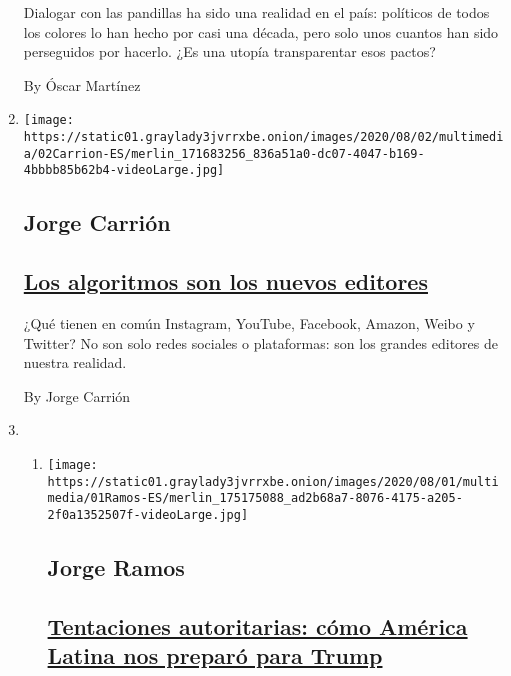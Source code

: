 \begin{enumerate}
  Dialogar con las pandillas ha sido una realidad en el país: políticos
  de todos los colores lo han hecho por casi una década, pero solo unos
  cuantos han sido perseguidos por hacerlo. ¿Es una utopía transparentar
  esos pactos?

  By Óscar Martínez
\item
  \texttt{[image: https://static01.graylady3jvrrxbe.onion/images/2020/08/02/multimedia/02Carrion-ES/merlin\_171683256\_836a51a0-dc07-4047-b169-4bbbb85b62b4-videoLarge.jpg]}

  \hypertarget{jorge-carriuxf3n}{%
  \subsection{Jorge Carrión}\label{jorge-carriuxf3n}}

  \hypertarget{los-algoritmos-son-los-nuevos-editores}{%
  \subsection{\texorpdfstring{\href{/es/2020/08/02/espanol/opinion/facebook-amazon-instagram.html}{Los
  algoritmos son los nuevos
  editores}}{Los algoritmos son los nuevos editores}}\label{los-algoritmos-son-los-nuevos-editores}}

  ¿Qué tienen en común Instagram, YouTube, Facebook, Amazon, Weibo y
  Twitter? No son solo redes sociales o plataformas: son los grandes
  editores de nuestra realidad.

  By Jorge Carrión
\item
  \begin{enumerate}
  \def\labelenumii{\arabic{enumii}.}
  \item
    \texttt{[image: https://static01.graylady3jvrrxbe.onion/images/2020/08/01/multimedia/01Ramos-ES/merlin\_175175088\_ad2b68a7-8076-4175-a205-2f0a1352507f-videoLarge.jpg]}

    \hypertarget{jorge-ramos}{%
    \subsection{Jorge Ramos}\label{jorge-ramos}}

    \hypertarget{tentaciones-autoritarias-cuxf3mo-amuxe9rica-latina-nos-preparuxf3-para-trump}{%
    \subsection{\texorpdfstring{\href{/es/2020/08/01/espanol/opinion/trump-autoritarismo.html}{Tentaciones
    autoritarias: cómo América Latina nos preparó para
    Trump}}{Tentaciones autoritarias: cómo América Latina nos preparó para Trump}}\label{tentaciones-autoritarias-cuxf3mo-amuxe9rica-latina-nos-preparuxf3-para-trump}}


\end{enumerate}
\end{enumerate}
